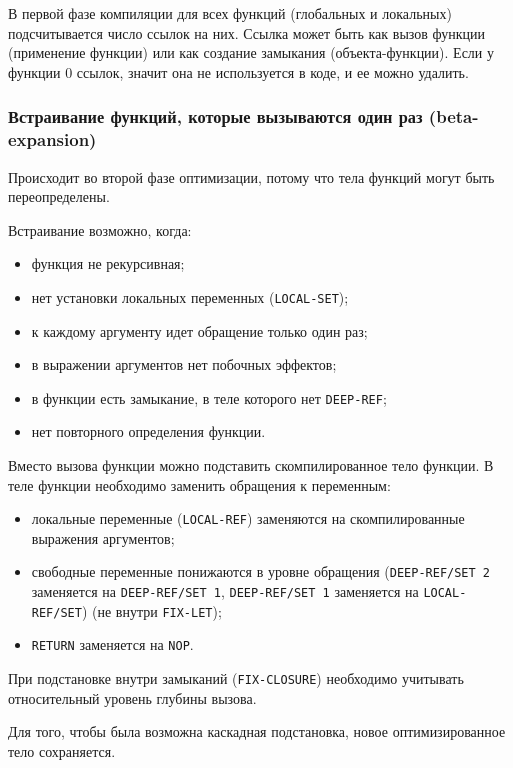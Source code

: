 В первой фазе компиляции для всех функций (глобальных и локальных) подсчитывается число ссылок на них. Ссылка может быть как вызов функции (применение функции) или как создание замыкания (объекта-функции). Если у функции 0 ссылок, значит она не используется в коде, и ее можно удалить.


\subsubsection{Встраивание функций, которые вызываются один раз (beta-expansion)}

Происходит во второй фазе оптимизации, потому что тела функций могут быть переопределены.

Встраивание возможно, когда:

\begin{itemize}
\item функция не рекурсивная;
\item нет установки локальных переменных (\texttt{LOCAL-SET});
\item к каждому аргументу идет обращение только один раз;
\item в выражении аргументов нет побочных эффектов;
\item в функции есть замыкание, в теле которого нет \texttt{DEEP-REF};
\item нет повторного определения функции.
\end{itemize}

Вместо вызова функции можно подставить скомпилированное тело функции. В теле функции необходимо заменить обращения к переменным:

\begin{itemize}
\item локальные переменные (\texttt{LOCAL-REF}) заменяются на скомпилированные выражения аргументов;
\item свободные переменные понижаются в уровне обращения (\texttt{DEEP-REF/SET 2} заменяется на \texttt{DEEP-REF/SET 1}, \texttt{DEEP-REF/SET 1} заменяется на \texttt{LOCAL-REF/SET}) (не внутри \texttt{FIX-LET});
\item \texttt{RETURN} заменяется на \texttt{NOP}.
\end{itemize}

При подстановке внутри замыканий (\texttt{FIX-CLOSURE}) необходимо учитывать относительный уровень глубины вызова.

Для того, чтобы была возможна каскадная подстановка, новое оптимизированное тело сохраняется.

